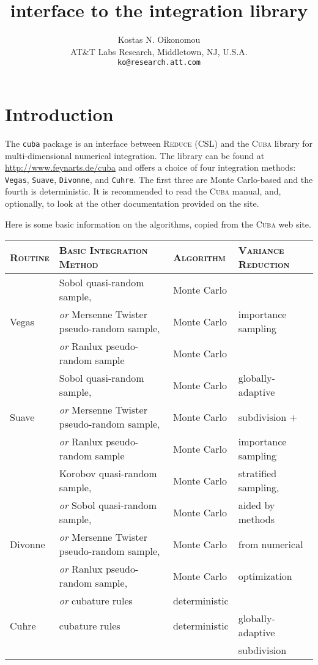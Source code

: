 \documentclass[11pt]{article}
\title{{\Reduce} interface to the {\Cuba} integration library}
\author{Kostas N. Oikonomou\\ AT\&T Labs Research, Middletown, NJ, U.S.A.
  \\ \small\texttt{ko@research.att.com}}
\newcommand{\Reduce}{\textsc{Reduce}}
\newcommand{\Cuba}{\textsc{Cuba}}
\begin{document}
\maketitle

\section{Introduction}

The \texttt{cuba} package is an interface between {\Reduce} (CSL) and the
{\Cuba} library for multi-dimensional numerical integration.  The library can be
found at \url{http://www.feynarts.de/cuba} and offers a choice of four
integration methods: \texttt{Vegas}, \texttt{Suave}, \texttt{Divonne}, and
\texttt{Cuhre}. The first three are Monte Carlo-based and the fourth is
deterministic.  It is recommended to read the {\Cuba} manual, and, optionally,
to look at the other documentation provided on the site.

Here is some basic information on the algorithms, copied from the {\Cuba} web
site.
\begin{table}[h]
  \small
  \begin{tabular}{|l|l|l|l|} \hline
   \textsc{Routine} & \textsc{Basic Integration Method} & \textsc{Algorithm} &
   \textsc{Variance Reduction} \\ \hline
         & Sobol quasi-random sample,  & Monte Carlo & \\
   Vegas & \emph{or} Mersenne Twister pseudo-random sample, & Monte Carlo &
   importance sampling \\
         & \emph{or} Ranlux pseudo-random sample & Monte Carlo & \\ \hline
         & Sobol quasi-random sample, & Monte Carlo  & globally-adaptive \\
   Suave & \emph{or} Mersenne Twister pseudo-random sample, & Monte Carlo & subdivision + \\
         & \emph{or} Ranlux pseudo-random sample & Monte Carlo & importance sampling \\ \hline
         & Korobov quasi-random sample,    & Monte Carlo &  stratified sampling, \\
         & \emph{or} Sobol quasi-random sample, & Monte Carlo & aided by methods \\
   Divonne & \emph{or} Mersenne Twister pseudo-random sample, & Monte Carlo &
   from numerical \\
         & \emph{or} Ranlux pseudo-random sample, & Monte Carlo & optimization \\
         & \emph{or} cubature rules & deterministic &  \\ \hline
   Cuhre & cubature rules & deterministic & globally-adaptive \\
         & & & subdivision \\ \hline
  \end{tabular}
\end{table}
\end{document}
